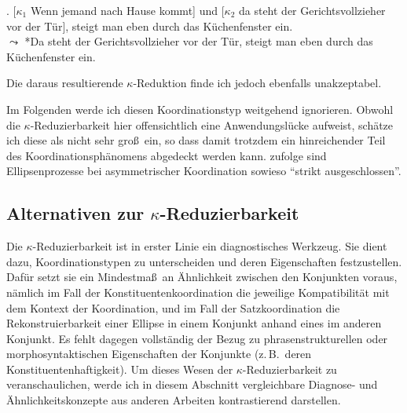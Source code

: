 \ex. \label{ex-ak-1} [$\kappa_1$ Wenn jemand nach Hause kommt] und [$\kappa_2$ da steht der Gerichtsvollzieher vor der Tür], steigt man eben durch das Küchenfenster ein. \\
$\leadsto$ *Da steht der Gerichtsvollzieher vor der Tür, steigt man eben durch das Küchenfenster ein.

Die daraus resultierende $\kappa$-Reduktion finde ich jedoch ebenfalls unakzeptabel.

Im Folgenden werde ich diesen Koordinationstyp weitgehend ignorieren. Obwohl die $\kappa$-Reduzierbarkeit hier offensichtlich eine Anwendungslücke aufweist, schätze ich diese als nicht sehr gro\ss\ ein, so dass damit trotzdem ein hinreichender Teil des Koordinationsphänomens abgedeckt werden kann. \citet[(173)]{Reich:09} zufolge sind Ellipsenprozesse bei asymmetrischer Koordination sowieso "`strikt ausgeschlossen"'.

\subsection{Alternativen zur $\kappa$-Reduzierbarkeit} \label{sec-koordinationsellipsen-5}

Die $\kappa$-Reduzierbarkeit ist in erster Linie ein diagnostisches Werkzeug. Sie dient dazu, Koordinationstypen zu unterscheiden und deren Eigenschaften festzustellen. Dafür setzt sie ein Mindestma\ss\ an Ähnlichkeit zwischen den Konjunkten voraus, nämlich im Fall der Konstituentenkoordination die jeweilige Kompatibilität mit dem Kontext der Koordination, und im Fall der Satzkoordination die Rekonstruierbarkeit einer  Ellipse in einem Konjunkt anhand eines  im anderen Konjunkt. Es fehlt dagegen vollständig der Bezug zu phrasenstrukturellen oder morphosyntaktischen Eigenschaften der Konjunkte (z.\,B.\  deren Konstituentenhaftigkeit).  
Um dieses Wesen der $\kappa$-Reduzierbarkeit zu veranschaulichen, werde ich in diesem Abschnitt vergleichbare Diagnose- und Ähnlichkeitskonzepte aus anderen Arbeiten kontrastierend darstellen. 

